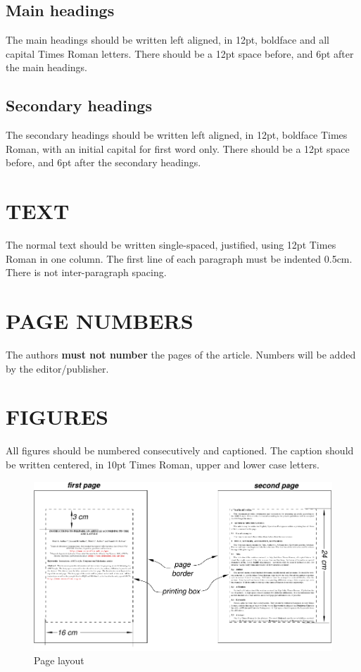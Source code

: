 \documentclass[oneside,a4paper,english,links]{amca}
\begin{document}
\subsection{Main headings}

The main headings should be written left aligned, in 12pt, boldface
and all capital Times Roman letters. There should be a 12pt space
before, and 6pt after the main headings.

\subsection{Secondary headings}

The secondary headings should be written left aligned, in 12pt,
boldface Times Roman, with an initial capital for first word only. There
should be a 12pt space before, and 6pt after the secondary headings.

\section{TEXT}

The normal text should be written single-spaced, justified, using 12pt
Times Roman in one column. The first line of each paragraph must be
indented 0.5cm. There is not inter-paragraph spacing.

\section{PAGE NUMBERS}

The authors {\bf must not number} the pages of the article. Numbers will
be added by the editor/publisher. 

\section{FIGURES}

All figures should be numbered consecutively and captioned. The
caption should be written centered, in 10pt Times Roman, upper and lower
case letters.

\begin{figure}[htb]
\centerline{\includegraphics{firstpage}}
\caption{Page layout}
\label{fg:figure}
\end{figure}
\end{document}
